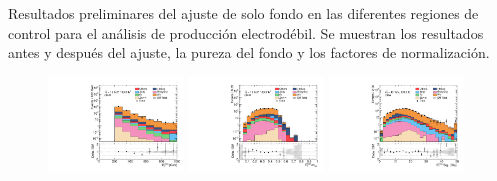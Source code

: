 \vspace{2cm}


\begin{table}[ht!]
  \centering
  \caption{Resultados preliminares del ajuste de solo fondo en las diferentes regiones de control para el análisis de producción electrodébil. Se muestran los resultados antes y después del ajuste, la pureza del fondo y los factores de normalización.}
  \resizebox{\textwidth}{!}{}
  \label{tab:bkg_only_fit_ewk}
\end{table}


\begin{figure}[ht!]

\centering

    \includegraphics[width=0.32\textwidth]{images/analysis_EWK/v192_2_nosyst/can_CRW_met_et_afterFit.pdf}
    \includegraphics[width=0.32\textwidth]{images/analysis_EWK/v192_2_nosyst/can_CRW_met_etmeff_afterFit.pdf}
    \includegraphics[width=0.32\textwidth]{images/analysis_EWK/v192_2_nosyst/can_CRW_met_sig_obj_afterFit.pdf}


\end{figure}
